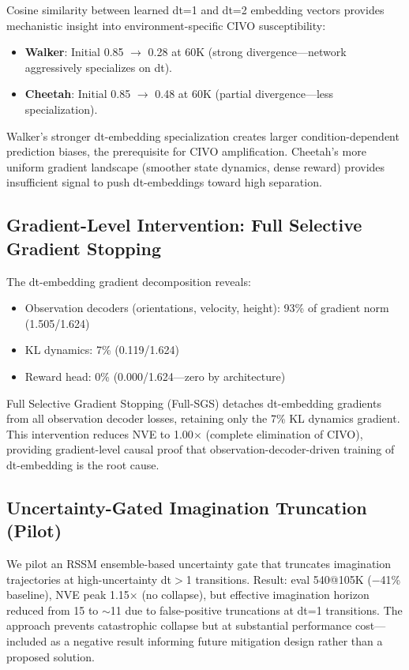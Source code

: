 \documentclass[10pt,letterpaper]{article}
\begin{document}
Cosine similarity between learned dt=1 and dt=2 embedding vectors provides mechanistic insight into environment-specific CIVO susceptibility:
\begin{itemize}
    \item \textbf{Walker}: Initial 0.85 $\rightarrow$ 0.28 at 60K (strong divergence---network aggressively specializes on dt).
    \item \textbf{Cheetah}: Initial 0.85 $\rightarrow$ 0.48 at 60K (partial divergence---less specialization).
\end{itemize}

Walker's stronger dt-embedding specialization creates larger condition-dependent prediction biases, the prerequisite for CIVO amplification. Cheetah's more uniform gradient landscape (smoother state dynamics, dense reward) provides insufficient signal to push dt-embeddings toward high separation.

\subsection{Gradient-Level Intervention: Full Selective Gradient Stopping}

The dt-embedding gradient decomposition reveals:
\begin{itemize}
    \item Observation decoders (orientations, velocity, height): 93\% of gradient norm (1.505/1.624)
    \item KL dynamics: 7\% (0.119/1.624)
    \item Reward head: 0\% (0.000/1.624---zero by architecture)
\end{itemize}

Full Selective Gradient Stopping (Full-SGS) detaches dt-embedding gradients from all observation decoder losses, retaining only the 7\% KL dynamics gradient. This intervention reduces NVE to 1.00$\times$ (complete elimination of CIVO), providing gradient-level causal proof that observation-decoder-driven training of dt-embedding is the root cause.

\subsection{Uncertainty-Gated Imagination Truncation (Pilot)}

We pilot an RSSM ensemble-based uncertainty gate that truncates imagination trajectories at high-uncertainty dt$>$1 transitions. Result: eval 540@105K ($-$41\% baseline), NVE peak 1.15$\times$ (no collapse), but effective imagination horizon reduced from 15 to $\sim$11 due to false-positive truncations at dt=1 transitions. The approach prevents catastrophic collapse but at substantial performance cost---included as a negative result informing future mitigation design rather than a proposed solution.
\end{document}
